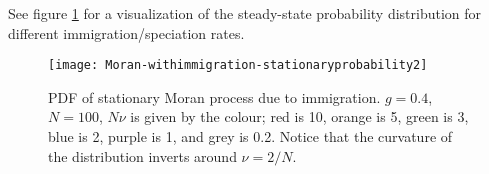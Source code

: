 \fi
See figure \ref{stationary-fig2} for a visualization of the steady-state probability distribution for different immigration/speciation rates. 
\begin{figure}[ht]
	\centering
	\texttt{[image: Moran-withimmigration-stationaryprobability2]}
	\caption{PDF of stationary Moran process due to immigration. $g=0.4$, $N=100$, $N\nu$ is given by the colour; red is 10, orange is 5, green is 3, blue is 2, purple is 1, and grey is 0.2. Notice that the curvature of the distribution inverts around $\nu=2/N$. } \label{stationary-fig2}
\end{figure}

